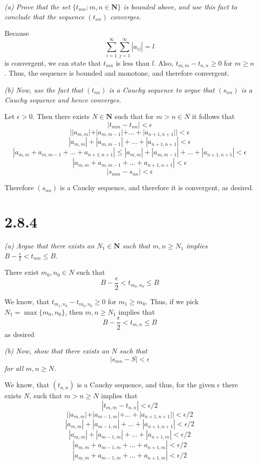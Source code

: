 \documentclass[11pt,oneside,titlepage]{book}
\begin{document}
\textit{(a) Prove that the set $\{t_{mn}: m, n \in \textbf{N}\}$ is bounded
  above, and use this fact to conclude that the sequence $(t_{nn})$ converges.}

Because
$$\sum_{i = 1}^{\infty}\sum_{j = 1}^{\infty}|a_{ij}| = l$$
is convergent, we can state that $t_{mn}$ is less than $l$. Also,
$t_{m, m} - t_{n,n} \geq 0$ for $m \geq n$. Thus, the sequence is bounded
and monotone, and therefore convergent.

\textit{(b) Now, use the fact that $(t_{nn})$ is a Cauchy sequence to argue
  that $(s_{nn})$ is a Cauchy sequence and hence converges.}

Let $\epsilon > 0$. Then there exists $N \in \textbf{N}$ such  that for
$m > n \in N$ it follows that
$$|t_{mm} - t_{nn}| < \epsilon$$
$$||a_{m,m}| + |a_{m, m - 1}| + ... + |a_{n + 1, n + 1}|| < \epsilon$$
$$|a_{m,m}| + |a_{m, m - 1}| + ... + |a_{n + 1, n + 1}| < \epsilon$$
$$|a_{m,m} + a_{m, m - 1} + ... + a_{n + 1, n + 1}| \leq |a_{m,m}| + |a_{m, m - 1}| + ... + |a_{n + 1, n + 1}| < \epsilon$$
$$|a_{m,m} + a_{m, m - 1} + ... + a_{n + 1, n + 1}|  < \epsilon$$
$$|s_{mm} - s_{nn}|  < \epsilon$$

Therefore $(s_{nn})$ is a Cauchy sequence, and therefore it is convergent, as
desired.

\section*{2.8.4}
\textit{(a) Argue that there exists an $N_1 \in \textbf{N}$ such that
  $m, n \geq N_1$ implies $B - \frac{\epsilon}{2} < t_{mn} \leq B$.}

There exist $m_0, n_0 \in N$ such that
$$B - \frac{\epsilon}{2} < t_{m_0, n_0} \leq B$$

We know, that $t_{m_1, n_0} - t_{m_0, n_0} \geq 0$ for $m_1 \geq m_0$. Thus,
if we pick $N_1 = \max\{m_0, n_0\}$, then $m, n \geq N_1$ implies that 
$$B - \frac{\epsilon}{2} < t_{m, n} \leq B$$
as desired

\textit{(b) Now, show that there exists an $N$ such that }
$$|s_{mn} - S| < \epsilon$$
\textit{for all $m, n \geq N$.}

We know, that $(t_{n,n})$ is a Cauchy sequence, and thus, for the given
$\epsilon$ there exists $N$, such that $m > n \geq N$ implies that 
$$|t_{m,m} - t_{n,n}| < \epsilon/2$$
$$||a_{m,m}| + |a_{m - 1, m}| + ... + |a_{n + 1,n + 1}|| < \epsilon/2$$
$$|a_{m,m}| + |a_{m - 1, m}| + ... + |a_{n + 1,n + 1}| < \epsilon/2$$
$$|a_{m,m}| + |a_{m - 1, m}| + ... + |a_{n + 1,m}| < \epsilon/2$$
$$|a_{m,m} + a_{m - 1, m} + ... + a_{n + 1,m}| < \epsilon/2$$
$$|a_{m,m} + a_{m - 1, m} + ... + a_{n + 1,m}| < \epsilon/2$$
\end{document}
